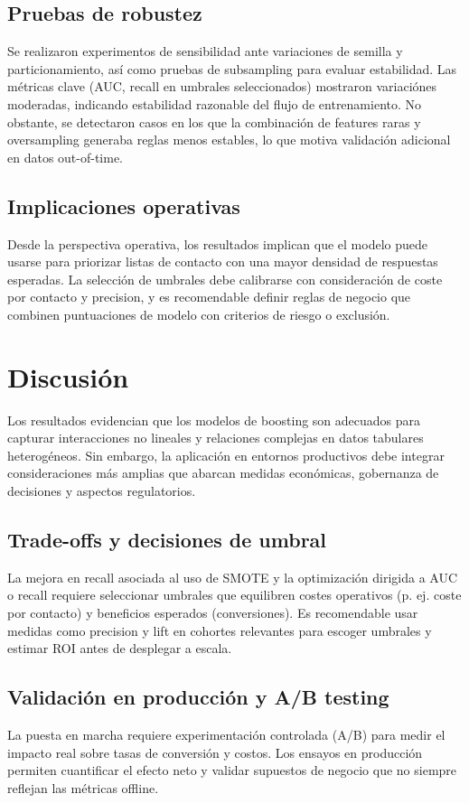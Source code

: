 \documentclass[12pt,a4paper]{article}
\begin{document}
\subsection{Pruebas de robustez}
Se realizaron experimentos de sensibilidad ante variaciones de semilla y particionamiento, as\'i como pruebas de subsampling para evaluar estabilidad. Las m\'etricas clave (AUC, recall en umbrales seleccionados) mostraron variaci\'ones moderadas, indicando estabilidad razonable del flujo de entrenamiento. No obstante, se detectaron casos en los que la combinaci\'on de features raras y oversampling generaba reglas menos estables, lo que motiva validaci\'on adicional en datos out-of-time.

\subsection{Implicaciones operativas}
Desde la perspectiva operativa, los resultados implican que el modelo puede usarse para priorizar listas de contacto con una mayor densidad de respuestas esperadas. La selecci\'on de umbrales debe calibrarse con consideraci\'on de coste por contacto y precision, y es recomendable definir reglas de negocio que combinen puntuaciones de modelo con criterios de riesgo o exclusi\'on.

\section{Discusi\'on}
Los resultados evidencian que los modelos de boosting son adecuados para capturar interacciones no lineales y relaciones complejas en datos tabulares heterog\'eneos. Sin embargo, la aplicaci\'on en entornos productivos debe integrar consideraciones m\'as amplias que abarcan medidas econ\'omicas, gobernanza de decisiones y aspectos regulatorios.

\subsection{Trade-offs y decisiones de umbral}
La mejora en recall asociada al uso de SMOTE y la optimizaci\'on dirigida a AUC o recall requiere seleccionar umbrales que equilibren costes operativos (p. ej. coste por contacto) y beneficios esperados (conversiones). Es recomendable usar medidas como precision y lift en cohortes relevantes para escoger umbrales y estimar ROI antes de desplegar a escala.

\subsection{Validaci\'on en producci\'on y A/B testing}
La puesta en marcha requiere experimentaci\'on controlada (A/B) para medir el impacto real sobre tasas de conversi\'on y costos. Los ensayos en producci\'on permiten cuantificar el efecto neto y validar supuestos de negocio que no siempre reflejan las m\'etricas offline.
\end{document}
